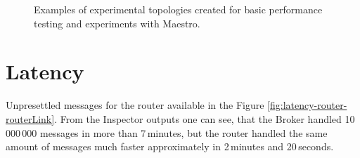 \begin{figure}[H]
	\centering
	\begin{minipage}{0.49\linewidth}
	\end{minipage}
	\begin{minipage}{0.49\linewidth}
	\end{minipage}
	\caption[Examples of experimental topologies created for basic performance testing and experiments with Maestro.]{Examples of experimental topologies created for basic performance testing and experiments with Maestro.}
  \label{fig:routerLink-throughput}
\end{figure}

\section*{Latency}

Unpresettled messages for the router available in the Figure \ref{fig:latency-router-routerLink}. From the Inspector outputs one can see, that the Broker handled 10\,000\,000 messages in more than 7\,minutes, but the router handled the same amount of messages much faster approximately in 2\,minutes and 20\,seconds.

